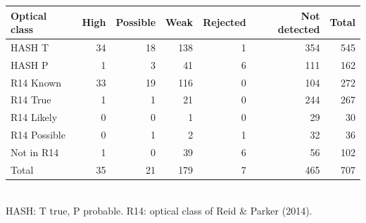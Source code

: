 \begin{tabular}{lrrrrrr}
\toprule
Optical class & High & Possible & Weak & Rejected & Not detected & Total \\
\midrule
HASH T & 34 & 18 & 138 & 1 & 354 & 545 \\
HASH P & 1 & 3 & 41 & 6 & 111 & 162 \\
\midrule
R14 Known & 33 & 19 & 116 & 0 & 104 & 272 \\
R14 True & 1 & 1 & 21 & 0 & 244 & 267 \\
R14 Likely & 0 & 0 & 1 & 0 & 29 & 30 \\
R14 Possible & 0 & 1 & 2 & 1 & 32 & 36 \\
Not in R14 & 1 & 0 & 39 & 6 & 56 & 102 \\
\midrule
Total & 35 & 21 & 179 & 7 & 465 & 707 \\
\bottomrule
\end{tabular}
\\[2pt]
{\footnotesize HASH: T true, P probable. R14: optical class of Reid \& Parker (2014).}
